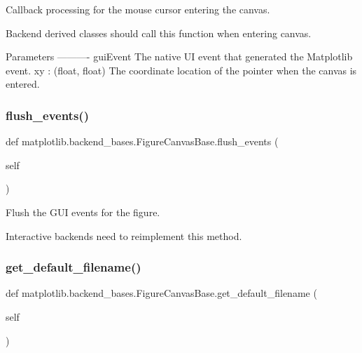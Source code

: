 \begin{DoxyVerb}Callback processing for the mouse cursor entering the canvas.

Backend derived classes should call this function when entering
canvas.

Parameters
----------
guiEvent
    The native UI event that generated the Matplotlib event.
xy : (float, float)
    The coordinate location of the pointer when the canvas is entered.
\end{DoxyVerb}
 \mbox{\label{classmatplotlib_1_1backend__bases_1_1FigureCanvasBase_ae27a5ffc8f879551b915dbb0ea97e668}} 
\subsubsection{\texorpdfstring{flush\+\_\+events()}{flush\_events()}}
{\footnotesize\ttfamily def matplotlib.\+backend\+\_\+bases.\+Figure\+Canvas\+Base.\+flush\+\_\+events (\begin{DoxyParamCaption}\item[{}]{self }\end{DoxyParamCaption})}

\begin{DoxyVerb}Flush the GUI events for the figure.

Interactive backends need to reimplement this method.
\end{DoxyVerb}
 \mbox{\label{classmatplotlib_1_1backend__bases_1_1FigureCanvasBase_a5c2424c42bbdae1c4a00104f1697e053}} 
\subsubsection{\texorpdfstring{get\+\_\+default\+\_\+filename()}{get\_default\_filename()}}
{\footnotesize\ttfamily def matplotlib.\+backend\+\_\+bases.\+Figure\+Canvas\+Base.\+get\+\_\+default\+\_\+filename (\begin{DoxyParamCaption}\item[{}]{self }\end{DoxyParamCaption})}

